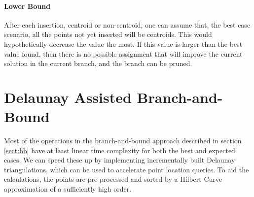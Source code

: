 \paragraph{Lower Bound}
After each insertion, centroid or non-centroid, one can assume that, the best case scenario, all the points not yet inserted will be centroids. This would hypothetically decrease the value the most. If this value is larger than the best value found, then there is no possible assignment that will improve the current solution in the current branch, and the branch can be pruned.
\paragraph{}
\section{Delaunay Assisted Branch-and-Bound}
\paragraph{}
Most of the operations in the branch-and-bound approach described in section \ref{sect:bb} have at least linear time complexity for both the best and expected cases. We can speed these up by implementing incrementally built Delaunay triangulations, which can be used to accelerate point location queries. To aid the calculations, the points are pre-processed and sorted by a Hilbert Curve approximation of a sufficiently high order.

